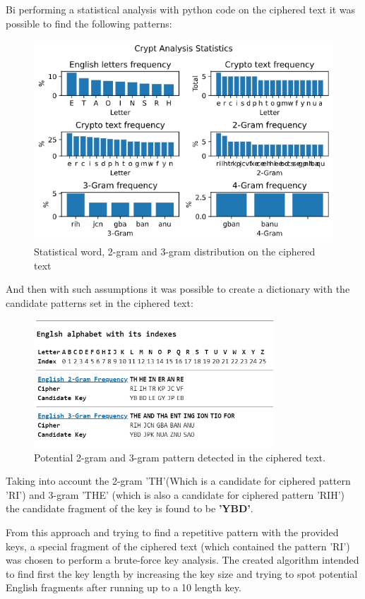 \documentclass[letterpaper,12pt]{article}
\begin{document}
Bi performing a statistical analysis with python code on the ciphered text it was possible to find the following patterns:
\begin{figure}[H]
    \centering
    \includegraphics[width=1\textwidth]{assets/cryptstatistics.png}
    \caption{Statistical word, 2-gram and 3-gram distribution on the ciphered text}
\end{figure}

And then with such assumptions it was possible to create a dictionary with the candidate patterns set in the ciphered text:
\begin{figure}[H]
    \centering
    \includegraphics[width=0.8\textwidth]{assets/CryptStatisticsDict.png}
    \caption{Potential 2-gram and 3-gram pattern detected in the ciphered text.}
\end{figure}

Taking into account the 2-gram 'TH'(Which is a candidate for ciphered pattern 'RI') and 3-gram 'THE' (which is also a candidate for ciphered pattern 'RIH') the candidate fragment of the key is found to be \textbf{'YBD'}.

From this approach and trying to find a repetitive pattern with the provided keys, a special fragment of the ciphered text (which contained the pattern 'RI') was chosen to perform a brute-force key analysis. The created algorithm intended to find first the key length by increasing the key size and trying to spot potential English fragments after running up to a 10 length key.
\end{document}
